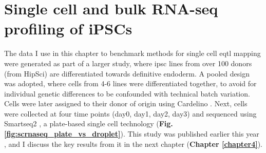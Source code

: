\newpage

\section{Single cell and bulk RNA-seq profiling of iPSCs}

The data I use in this chapter to benchmark methods for single cell \gls{eqtl} mapping 
were generated as part of a larger study, where \gls{ipsc} lines from over 100 donors (from HipSci) are differentiated towards definitive endoderm.
A pooled design was adopted, where cells from 4-6 lines were differentiated together, to avoid for individual genetic differences to be confounded with technical batch variation. 
Cells were later assigned to their donor of origin using Cardelino \cite{mccarthy2020cardelino}. 
Next, cells were collected at four time points (day0, day1, day2, day3) and sequenced using Smartseq2 \cite{picelli2013smart}, a plate-based single cell technology (\textbf{Fig. \ref{fig:scrnaseq_plate_vs_droplet}}).
This study was published earlier this year \cite{cuomo2020single}, and I discuss the key results from it in the next chapter (\textbf{Chapter 
\ref{chapter4}}).
\\


